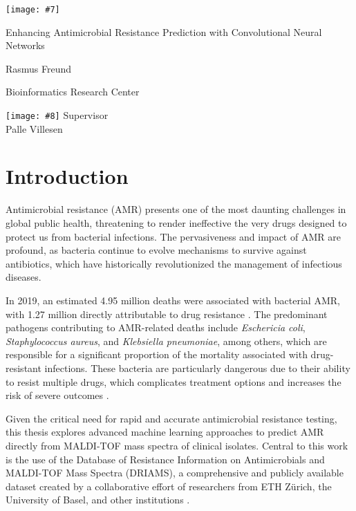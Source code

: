 \documentclass[english,11pt,a4paper,titlepage]{article}
\newcommand{\frontpageBlue}[8]{
	\begin{titlepage}
		\pagecolor{sectioncolor}\afterpage{\nopagecolor}
		\centering
		\texttt{[image: \#7]}\par
		\vspace{1cm}
		{\fontsize{34}{40}\selectfont\color{white}\titlefont #1\par} %
		\vspace{2cm}
		{\color{white}\Large\headingfont #2\par} %
		{\color{white}\large\headingfont #3\par} %
		\vspace{1cm}
		{\color{white}\Large\headingfont #4\par} %
		{\color{white}\large\headingfont #5\par} %
		\vspace{1cm}
		\texttt{[image: \#8]} %
		\vfill
		{\color{white}\Large\headingfont #6}
	\end{titlepage}
}
\newcommand{\frontpageWhite}[8]{
	\begin{titlepage}
		\centering
		\texttt{[image: \#7]}\par
		\vspace{1cm}
		{\fontsize{26}{28}\selectfont\color{sectioncolor}\titlefont #1\par} %
		\vspace{2cm}
		{\Large\headingfont\color{sectioncolor} #2\par} %
		{\large\headingfont\color{sectioncolor} #3\par} %
		\vspace{0.1cm}
		{\Large\headingfont\color{sectioncolor} #4\par} %
		{\large\headingfont\color{sectioncolor} #5\par} %
		\vspace{1cm}
		\texttt{[image: \#8]} %
		\vfill
		{\Large\headingfont\color{sectioncolor} #6}
	\end{titlepage}	
}
\begin{document}
\setlength{\parindent}{25pt} %




\frontpageWhite{Enhancing Antimicrobial Resistance Prediction with Convolutional Neural Networks}{Rasmus Freund}{Bioinformatics Research Center}{}{}{Supervisor\\Palle Villesen}{img/ausegl.png}{img/au_blue.png}


\begin{abstract}
	\noindent %
	\kant[1]
\end{abstract}

\captionsetup{font=small}

\section*{Introduction}
Antimicrobial resistance (AMR) presents one of the most daunting challenges in global public health, threatening to render ineffective the very drugs designed to protect us from bacterial infections. The pervasiveness and impact of AMR are profound, as bacteria continue to evolve mechanisms to survive against antibiotics, which have historically revolutionized the management of infectious diseases. 

In 2019, an estimated 4.95 million deaths were associated with bacterial AMR, with 1.27 million directly attributable to drug resistance	\cite{murrayGlobalBurdenBacterial2022}. The predominant pathogens contributing to AMR-related deaths include \textit{Eschericia coli}, \textit{Staphylococcus aureus}, and \textit{Klebsiella pneumoniae}, among others, which are responsible for a significant proportion of the mortality associated with drug-resistant infections. These bacteria are particularly dangerous due to their ability to resist multiple drugs, which complicates treatment options and increases the risk of severe outcomes \cite{murrayGlobalBurdenBacterial2022}.

Given the critical need for rapid and accurate antimicrobial resistance testing, this thesis explores advanced machine learning approaches to predict AMR directly from MALDI-TOF mass spectra of clinical isolates. Central to this work is the use of the Database of Resistance Information on Antimicrobials and MALDI-TOF Mass Spectra (DRIAMS), a comprehensive and publicly available dataset created by a collaborative effort of researchers from ETH Zürich, the University of Basel, and other institutions \cite{weis2021driams}.
\end{document}
